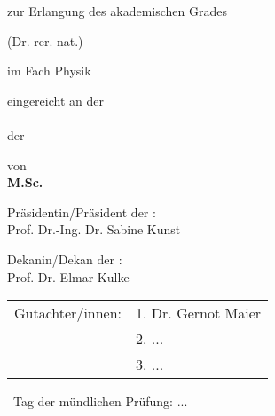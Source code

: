 \makeatletter
\begin{titlepage}
\begin{spacing}{1}
  \setlength{\parindentbak}{\parindent}
  \setlength{\parskipbak}{\parskip}

\setlength{\parindent}{0pt}
\setlength{\parskip}{\baselineskip}

\thispagestyle{empty}

\expandafter \Large\sffamily \expandafter

\begin{center}
\begin{spacing}{1.2}
\begingroup
\fontsize{18pt}{10pt}\selectfont
{\textbf{\mytitle}}
\endgroup
\end{spacing}

\vfill


zur Erlangung des akademischen Grades


(Dr. rer. nat.)

im Fach Physik

eingereicht an der \\ \myfaculty \\ der \myuni 

von\\

\textbf{M.Sc. \myname} \\

\vfill
\vfill

Pr\"asidentin/Pr\"asident der \myuni: \\
\vspace{0.2\baselineskip}
Prof. Dr.-Ing. Dr. Sabine Kunst  \\
\vspace{\baselineskip}

Dekanin/Dekan der \myfaculty: \\
\vspace{0.2\baselineskip}
Prof. Dr. Elmar Kulke  \\
\vspace{1.5\baselineskip}

\end{center}
\noindent
\begin{tabular}{ll}
Gutachter/innen: 
& 1. Dr. Gernot Maier \\
& 2. ... \\
& 3. ... \\
\end{tabular}

~Tag der m\"undlichen Pr\"ufung: ...

\setlength{\parindent}{\parindentbak}
\setlength{\parskip}{\parskipbak}
\end{spacing}
\end{titlepage}
\makeatother
